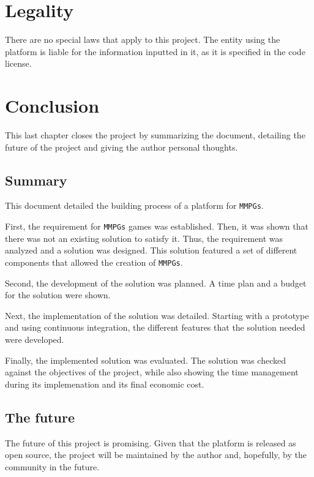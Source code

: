 \documentclass[a4paper,11pt,titlepage,abstract,numbers=noenddot,automark,mnsy,intlimits,rgb,dvipsnames]{report}
\begin{document}
\chapter{Legality}
There are no special laws that apply to this project. The entity using the platform
is liable for the information inputted in it, as it is specified in the code license.
\chapter{Conclusion}
This last chapter closes the project by summarizing the document, detailing the future of the project and
giving the author personal thoughts.
\section{Summary}
This document detailed the building process of a platform for \texttt{MMPGs}.

First, the requirement for \texttt{MMPGs} games was established. Then, it was shown that there was not
an existing solution to satisfy it. Thus, the requirement was analyzed and a solution was designed. This solution
featured a set of different components that allowed the creation of \texttt{MMPGs}.

Second, the development of the solution was planned. A time plan and a budget for the solution were shown.

Next, the implementation of the solution was detailed. Starting with a prototype and using continuous integration, the different
features that the solution needed were developed.

Finally, the implemented solution was evaluated. The solution was checked against the objectives of the project,
while also showing the time management during its implemenation and its final economic cost.
\section{The future}
The future of this project is promising. Given that the platform is released as open source, the project will be maintained
by the author and, hopefully, by the community in the future.
\end{document}
